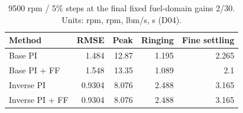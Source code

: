 \begin{table}[htbp]\centering\small\setlength{\tabcolsep}{4pt}\begin{tabular}{@{}lrrrr@{}}\toprule
Method & RMSE & Peak & Ringing & Fine settling\\\midrule
Base PI & 1.484 & 12.87 & 1.195 & 2.265\\
Base PI + FF & 1.548 & 13.35 & 1.089 & 2.1\\
Inverse PI & 0.9304 & 8.076 & 2.488 & 3.165\\
Inverse PI + FF & 0.9304 & 8.076 & 2.488 & 3.165\\
\bottomrule\end{tabular}\caption{9500 rpm / 5\% steps at the final fixed fuel-domain gains 2/30. Units: rpm, rpm, lbm/s, s (D04).}\label{tab:fixed_target}\end{table}